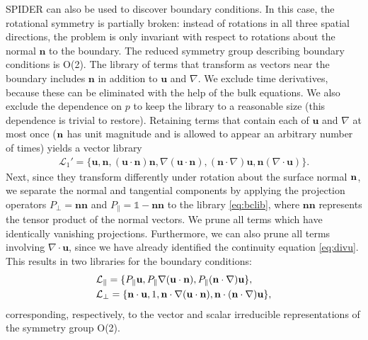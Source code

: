 \documentclass[preprint]{article}
\def\bi#1{\textbf{#1}}
\begin{document}
SPIDER can also be used to discover boundary conditions. In this case, the rotational symmetry is partially broken: instead of rotations in all three spatial directions, the problem is only invariant with respect to rotations about the normal ${\bi n}$ to the boundary. {The reduced symmetry group describing boundary conditions is O(2).} The library of terms that transform as vectors near the boundary includes ${\bi n}$ in addition to ${\bi u}$ and $\nabla$. We exclude time derivatives, because these can be eliminated with the help of the bulk equations. We also exclude the dependence on $p$ to keep the library to a reasonable size (this dependence is trivial to restore). Retaining terms that contain each of ${\bi u}$ and $\nabla$ at most once {(${\bf n}$ has unit magnitude and is allowed to appear an arbitrary number of times)} yields a vector library
\begin{align}\label{eq:bclib}
    \mathcal{L}_1'=\{{\bi u},{\bi n},({\bi u} \cdot {\bi n}){\bi n},\nabla({\bi u} \cdot {\bi n}),({\bi n}\cdot \nabla){\bi u},{\bi n}(\nabla \cdot {\bi u})\}.
\end{align}
{Next, since they transform differently under rotation about the surface normal ${\bf n}$}, we separate the normal and tangential components by applying the projection operators $P_\perp={\bi n}{\bi n}$ and $P_\parallel=\mathbb{1}-{\bi n}{\bi n}$ to the library \eqref{eq:bclib}, where ${\bi n}{\bi n}$ represents the tensor product of the normal vectors. We prune all terms which have identically vanishing projections. Furthermore, we can also prune all terms involving $\nabla\cdot{\bi u}$, since we have already identified the continuity equation \eqref{eq:divu}. This results in two libraries for the boundary conditions:
\begin{align}\label{eq:bclib_proj}
    &\mathcal{L}_\parallel = \{ P_\parallel {\bi u}, P_\parallel\nabla({\bi u} \cdot {\bi n}), P_\parallel({\bi n}\cdot \nabla){\bi u}\},\\
    &\mathcal{L}_{\perp} = \{{\bi n} \cdot {\bi u},1,{\bi n} \cdot \nabla({\bi u} \cdot {\bi n}),{\bf n} \cdot ({\bi n}\cdot \nabla){\bi u}\},
\end{align}
{corresponding, respectively, to the vector and scalar irreducible representations of the symmetry group O(2).} 
\end{document}
